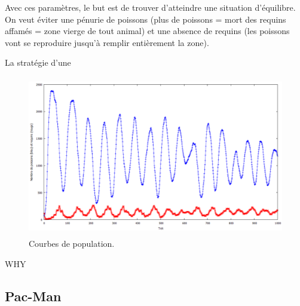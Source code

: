 \documentclass[a4paper]{article}
\begin{document}
\medskip
Avec ces paramètres, le but est de trouver d'atteindre une situation d'équilibre. On veut éviter une pénurie de poissons (plus de poissons = mort des requins affamés = zone vierge de tout animal) et une absence de requins (les poissons vont se reproduire jusqu'à remplir entièrement la zone).

\medskip
La stratégie d'une 


 
\begin{figure}[!h]
\centering
\includegraphics[height=7cm]{1000tours.png}
\caption{Courbes de population.}
\end{figure}

WHY
\subsection{Pac-Man}
\end{document}
